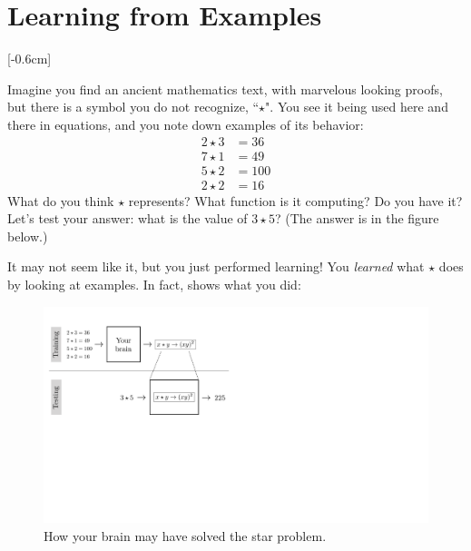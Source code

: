 
\section{Learning from Examples}
[-0.6cm]


Imagine you find an ancient mathematics text, with marvelous looking proofs, but there is a symbol you do not recognize, ``$\star$". You see it being used here and there in equations, and you note down examples of its behavior:
\begin{align}
    2 \star 3 & = 36\nonumber  \\
    7 \star 1 & = 49\nonumber  \\
    5 \star 2 & = 100\nonumber \\
    2 \star 2 & = 16\nonumber
\end{align}
What do you think $\star$ represents? What function is it computing? Do you have it? Let's test your answer: what is the value of $3 \star 5$? (The answer is in the figure below.)

It may not seem like it, but you just performed learning! You \emph{learned} what $\star$ does by looking at examples. In fact, \fig{\ref{fig:star_symbol_learning}} shows what you did:

\begin{figure}[h]
    \centerline{
        \includegraphics[width=0.75\linewidth]{./figures/intro_to_learning/star_symbol_learning.pdf}
    }
    \caption{How your brain may have solved the star problem.}
    \label{fig:star_symbol_learning}
\end{figure}

